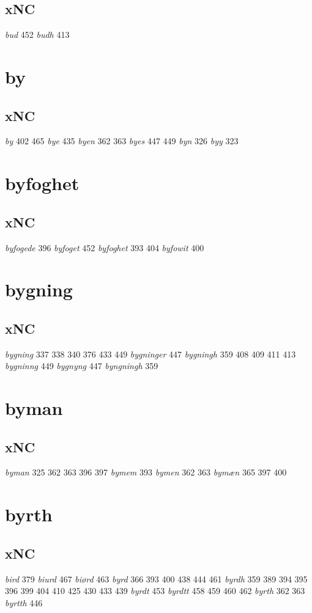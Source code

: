\documentclass[a4paper,twocolumn]{article}
\begin{document}
\subsection{xNC}
\label{sec:org455fa86}
\emph{bud} 452 \emph{budh} 413 
\section{by}
\label{sec:org07b14a1}
\subsection{xNC}
\label{sec:org54dd5eb}
\emph{by} 402 465 \emph{bye} 435 \emph{byen} 362 363 \emph{byes} 447 449 \emph{byn} 326 \emph{byy} 323 
\section{byfoghet}
\label{sec:orgecb246d}
\subsection{xNC}
\label{sec:org0c11dfb}
\emph{byfogede} 396 \emph{byfoget} 452 \emph{byfoghet} 393 404 \emph{byfowit} 400 
\section{bygning}
\label{sec:orga3e4348}
\subsection{xNC}
\label{sec:org5e271cd}
\emph{bygning} 337 338 340 376 433 449 \emph{bygninger} 447 \emph{bygningh} 359 408 409 411 413 \emph{bygninng} 449 \emph{bygnyng} 447 \emph{byngningh} 359 
\section{byman}
\label{sec:org5348f16}
\subsection{xNC}
\label{sec:org1128492}
\emph{byman} 325 362 363 396 397 \emph{bymem} 393 \emph{bymen} 362 363 \emph{bymæn} 365 397 400 
\section{byrth}
\label{sec:orgb2586ac}
\subsection{xNC}
\label{sec:orgac81f6f}
\emph{bird} 379 \emph{biurd} 467 \emph{biørd} 463 \emph{byrd} 366 393 400 438 444 461 \emph{byrdh} 359 389 394 395 396 399 404 410 425 430 433 439 \emph{byrdt} 453 \emph{byrdtt} 458 459 460 462 \emph{byrth} 362 363 \emph{byrtth} 446 
\end{document}
